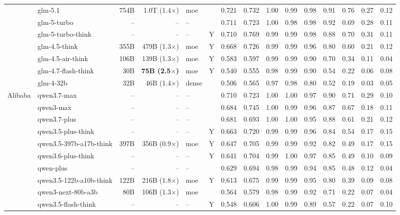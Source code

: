 \begin{longtable}{@{}ll r r l c rr rrrrrrr@{}}
 & glm-5.1 & 754B & 1.0T (1.4$\times$) & moe &  & 0.721 & 0.732 & 1.00 & 0.99 & 0.98 & 0.91 & 0.76 & 0.27 & 0.12 \\
 & glm-5-turbo & -- & -- & -- &  & 0.711 & 0.723 & 1.00 & 0.98 & 0.98 & 0.92 & 0.69 & 0.28 & 0.11 \\
 & glm-5-turbo-think & -- & -- & -- & Y & 0.710 & 0.769 & 0.99 & 0.99 & 0.98 & 0.88 & 0.70 & 0.31 & 0.11 \\
 & glm-4.5-think & 355B & 479B (1.3$\times$) & moe & Y & 0.668 & 0.726 & 0.99 & 0.99 & 0.96 & 0.80 & 0.60 & 0.21 & 0.12 \\
 & glm-4.5-air-think & 106B & 139B (1.3$\times$) & moe & Y & 0.583 & 0.597 & 0.99 & 0.99 & 0.90 & 0.70 & 0.34 & 0.11 & 0.04 \\
 & glm-4.7-flash-think & 30B & \textbf{75B (2.5$\times$)} & moe & Y & 0.540 & 0.555 & 0.98 & 0.99 & 0.90 & 0.54 & 0.22 & 0.06 & 0.08 \\
 & glm-4-32b & 32B & 46B (1.4$\times$) & dense &  & 0.506 & 0.565 & 0.97 & 0.98 & 0.80 & 0.52 & 0.19 & 0.03 & 0.05 \\
Alibaba & qwen3.7-max & -- & -- & -- &  & 0.710 & 0.723 & 1.00 & 1.00 & 0.97 & 0.90 & 0.71 & 0.29 & 0.10 \\
 & qwen3-max & -- & -- & -- &  & 0.684 & 0.745 & 1.00 & 0.99 & 0.96 & 0.87 & 0.67 & 0.18 & 0.11 \\
 & qwen3.7-plus & -- & -- & -- &  & 0.681 & 0.693 & 1.00 & 1.00 & 0.95 & 0.88 & 0.61 & 0.21 & 0.12 \\
 & qwen3.5-plus-think & -- & -- & -- & Y & 0.663 & 0.720 & 0.99 & 0.99 & 0.96 & 0.84 & 0.54 & 0.17 & 0.15 \\
 & qwen3.5-397b-a17b-think & 397B & 356B (0.9$\times$) & moe & Y & 0.647 & 0.705 & 0.99 & 0.99 & 0.92 & 0.82 & 0.49 & 0.17 & 0.15 \\
 & qwen3.6-plus-think & -- & -- & -- & Y & 0.641 & 0.704 & 0.99 & 1.00 & 0.97 & 0.85 & 0.49 & 0.10 & 0.09 \\
 & qwen-plus & -- & -- & -- &  & 0.629 & 0.694 & 0.98 & 0.99 & 0.94 & 0.85 & 0.48 & 0.12 & 0.04 \\
 & qwen3.5-122b-a10b-think & 122B & 216B (1.8$\times$) & moe & Y & 0.613 & 0.675 & 0.99 & 0.99 & 0.95 & 0.80 & 0.39 & 0.09 & 0.08 \\
 & qwen3-next-80b-a3b & 80B & 106B (1.3$\times$) & moe &  & 0.564 & 0.579 & 0.98 & 0.99 & 0.92 & 0.71 & 0.22 & 0.07 & 0.04 \\
 & qwen3.5-flash-think & -- & -- & -- & Y & 0.548 & 0.606 & 1.00 & 0.99 & 0.89 & 0.57 & 0.22 & 0.07 & 0.10 \\

\end{longtable}
